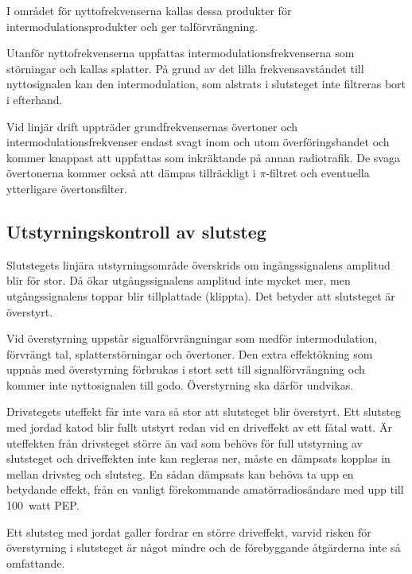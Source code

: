 I området för nyttofrekvenserna kallas dessa produkter för
intermodulationsprodukter och ger talförvrängning.

Utanför nyttofrekvenserna uppfattas intermodulationsfrekvenserna som
störningar och kallas splatter.
På grund av det lilla frekvensavståndet till nyttosignalen kan den
intermodulation, som alstrats i slutsteget inte filtreras bort i efterhand.

Vid linjär drift uppträder grundfrekvensernas övertoner och
intermodulationsfrekvenser endast svagt inom och utom
överföringsbandet och kommer knappast att uppfattas som inkräktande på
annan radiotrafik.
De svaga övertonerna kommer också att dämpas tillräckligt i \(\pi \)-filtret
och eventuella ytterligare övertonsfilter.


\subsection{Utstyrningskontroll av slutsteg}
\label{förstärkare_utstyrningskontroll}

Slutstegets linjära utstyrningsområde överskrids om ingångssignalens
amplitud blir för stor.
Då ökar utgångssignalens amplitud inte mycket mer, men utgångssignalens toppar
blir tillplattade (klippta).
Det betyder att slutsteget är överstyrt.

Vid överstyrning uppstår signalförvrängningar som medför intermodulation,
förvrängt tal, splatterstörningar och övertoner.
Den extra effektökning som uppnås med överstyrning förbrukas i stort sett
till signalförvrängning och kommer inte nyttosignalen till godo.
Överstyrning ska därför undvikas.

Drivstegets uteffekt får inte vara så stor att slutsteget blir överstyrt.
Ett slutsteg med jordad katod blir fullt utstyrt redan vid en driveffekt av ett
fåtal watt.
Är uteffekten från drivsteget större än vad som behövs för full utstyrning av
slutsteget och driveffekten inte kan regleras ner, måste en dämpsats
kopplas in mellan drivsteg och slutsteg.
En sådan dämpsats kan behöva ta upp en betydande effekt, från en vanligt
förekommande amatörradiosändare med upp till 100~watt PEP.

Ett slutsteg med jordat galler fordrar en större driveffekt, varvid
risken för överstyrning i slutsteget är något mindre och de
förebyggande åtgärderna inte så omfattande.

